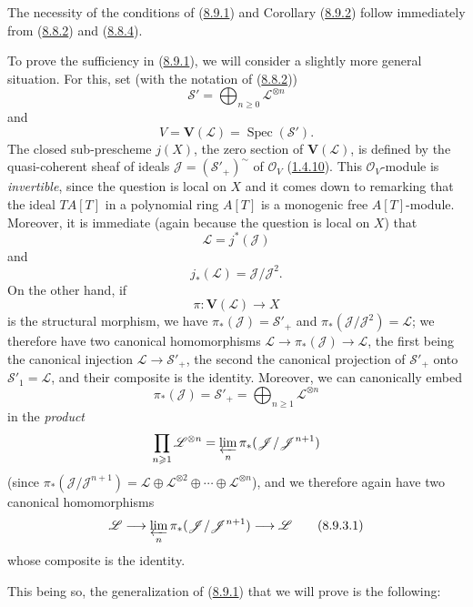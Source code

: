 \begin{env}[8.9.3]
\label{II.8.9.3}
The necessity of the conditions of (\hyperref[II.8.9.1]{8.9.1}) and
Corollary (\hyperref[II.8.9.2]{8.9.2}) follow immediately from
(\hyperref[II.8.8.2]{8.8.2}) and
(\hyperref[II.8.8.4]{8.8.4}).

To prove the sufficiency in (\hyperref[II.8.9.1]{8.9.1}), we
will consider a slightly more general situation. For this, set (with the
notation of (\hyperref[II.8.8.2]{8.8.2}))
\[
  \mathcal{S}'=\bigoplus_{n\geqslant 0}\mathcal{L}^{\otimes n}
\]
and
\[
  V=\mathbf{V}(\mathcal{L})=\operatorname{Spec}(\mathcal{S}').
\]
The closed sub-prescheme $j(X)$, the zero section of $\mathbf{V}(\mathcal{L})$,
is defined by the quasi-coherent sheaf of ideals
$\mathcal{J}=(\mathcal{S}'_+)^{\sim}$ of $\mathcal{O}_V$
(\hyperref[II.1.4.10]{1.4.10}). This $\mathcal{O}_V$-module is
\emph{invertible}, since the question is local on $X$ and it comes down to
remarking that the ideal $TA[T]$ in a polynomial ring $A[T]$ is a monogenic
free $A[T]$-module. Moreover, it is immediate (again because the
question is local on $X$) that
\[
  \mathcal{L}=j^*(\mathcal{J})
\]
and
\[
  j_*(\mathcal{L})=\mathcal{J}/\mathcal{J}^2.
\]
On the other hand, if
\[
  \pi:\mathbf{V}(\mathcal{L})\longrightarrow X
\]
is the structural morphism, we have
$\pi_*(\mathcal{J})=\mathcal{S}'_+$ and
$\pi_*(\mathcal{J}/\mathcal{J}^2)=\mathcal{L}$; we therefore have two
canonical homomorphisms
$\mathcal{L}\to\pi_*(\mathcal{J})\to\mathcal{L}$, the first being
the canonical injection $\mathcal{L}\to\mathcal{S}'_+$, the second the
canonical projection of $\mathcal{S}'_+$ onto $\mathcal{S}'_1=\mathcal{L}$,
and their composite is the identity. Moreover, we can canonically embed
\[
  \pi_*(\mathcal{J})=\mathcal{S}'_+
  =\bigoplus_{n\geqslant 1}\mathcal{L}^{\otimes n}
\]
in the \emph{product}
\[
  \prod_{n\geqslant 1}\mathcal{L}^{\otimes n}
  =\varprojlim_n\pi_*(\mathcal{J}/\mathcal{J}^{n+1})
\]
(since
$\pi_*(\mathcal{J}/\mathcal{J}^{n+1})=
\mathcal{L}\oplus\mathcal{L}^{\otimes2}\oplus\cdots\oplus
\mathcal{L}^{\otimes n}$), and we therefore again have two canonical
homomorphisms
\begin{equation}
\label{II.8.9.3.1}
  \mathcal{L}\longrightarrow
  \varprojlim_n\pi_*(\mathcal{J}/\mathcal{J}^{n+1})
  \longrightarrow\mathcal{L}
\tag{8.9.3.1}
\end{equation}
whose composite is the identity.

This being so, the generalization of (\hyperref[II.8.9.1]{8.9.1}) that we
will prove is the following:
\end{env}

